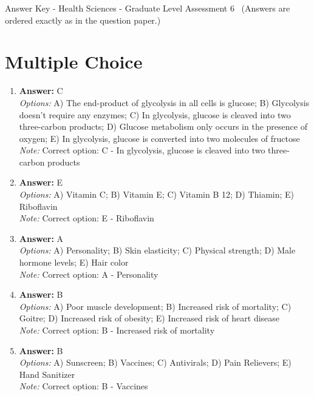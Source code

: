 \documentclass[12pt]{article}
\begin{document}
\begin{center}
Answer Key - Health Sciences - Graduate Level Assessment 6 \
\small (Answers are ordered exactly as in the question paper.)
\end{center}

\section*{Multiple Choice}
\begin{enumerate}[label=\arabic*.]
\item \textbf{Answer:} C
\\ \textit{Options:} A) The end-product of glycolysis in all cells is glucose; B) Glycolysis doesn't require any enzymes; C) In glycolysis, glucose is cleaved into two three-carbon products; D) Glucose metabolism only occurs in the presence of oxygen; E) In glycolysis, glucose is converted into two molecules of fructose
\\ \textit{Note:} Correct option: C - In glycolysis, glucose is cleaved into two three-carbon products
\item \textbf{Answer:} E
\\ \textit{Options:} A) Vitamin C; B) Vitamin E; C) Vitamin B 12; D) Thiamin; E) Riboflavin
\\ \textit{Note:} Correct option: E - Riboflavin
\item \textbf{Answer:} A
\\ \textit{Options:} A) Personality; B) Skin elasticity; C) Physical strength; D) Male hormone levels; E) Hair color
\\ \textit{Note:} Correct option: A - Personality
\item \textbf{Answer:} B
\\ \textit{Options:} A) Poor muscle development; B) Increased risk of mortality; C) Goitre; D) Increased risk of obesity; E) Increased risk of heart disease
\\ \textit{Note:} Correct option: B - Increased risk of mortality
\item \textbf{Answer:} B
\\ \textit{Options:} A) Sunscreen; B) Vaccines; C) Antivirals; D) Pain Relievers; E) Hand Sanitizer
\\ \textit{Note:} Correct option: B - Vaccines
\end{enumerate}
\end{document}
